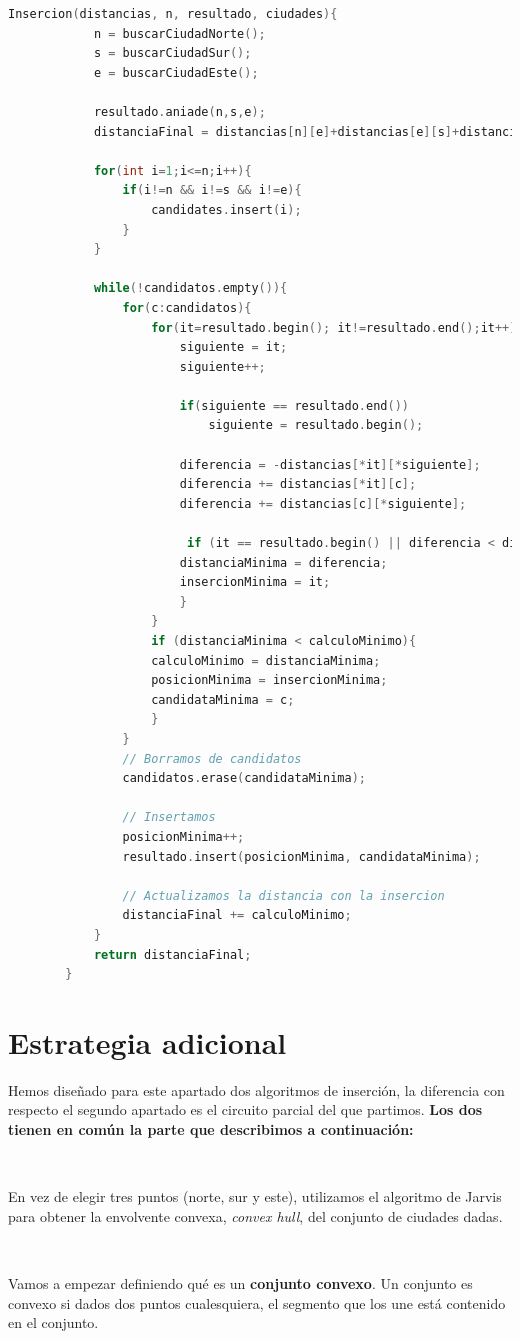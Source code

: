 \documentclass{article}
\begin{document}
	\begin{lstlisting}[caption=Pseudocódigo de la segunda heurística, language=c]
		Insercion(distancias, n, resultado, ciudades){
			n = buscarCiudadNorte();
			s = buscarCiudadSur();
			e = buscarCiudadEste();
			
			resultado.aniade(n,s,e);
			distanciaFinal = distancias[n][e]+distancias[e][s]+distancias[s][n];
			
			for(int i=1;i<=n;i++){
				if(i!=n && i!=s && i!=e){
					candidates.insert(i);
				}
			}
			
			while(!candidatos.empty()){
				for(c:candidatos){
					for(it=resultado.begin(); it!=resultado.end();it++){
						siguiente = it;
						siguiente++;
						
						if(siguiente == resultado.end())
							siguiente = resultado.begin();
							
						diferencia = -distancias[*it][*siguiente];
						diferencia += distancias[*it][c];
						diferencia += distancias[c][*siguiente];
						
						 if (it == resultado.begin() || diferencia < distanciaMinima){
						distanciaMinima = diferencia;
						insercionMinima = it;
						}
					}
					if (distanciaMinima < calculoMinimo){
					calculoMinimo = distanciaMinima;
					posicionMinima = insercionMinima;
					candidataMinima = c;
					}
				}
				// Borramos de candidatos
				candidatos.erase(candidataMinima);
				
				// Insertamos 
				posicionMinima++;
				resultado.insert(posicionMinima, candidataMinima);
				
				// Actualizamos la distancia con la insercion
				distanciaFinal += calculoMinimo;
			}
			return distanciaFinal;
		}
	\end{lstlisting}
\section{Estrategia adicional}
	Hemos diseñado para este apartado dos algoritmos de inserción, la diferencia con respecto el segundo apartado es el circuito parcial del que partimos. \textbf{Los dos tienen en común la parte que describimos a continuación:}
	
	
	\
	
	En vez de elegir tres puntos (norte, sur y este), utilizamos el algoritmo de Jarvis para obtener la envolvente convexa, \textit{convex hull}, del conjunto de ciudades dadas.
	
	\
	
	Vamos a empezar definiendo qué es un \textbf{conjunto convexo}. Un conjunto es convexo si dados dos puntos cualesquiera, el segmento que los une está contenido en el conjunto. 
	\
	
\end{document}
